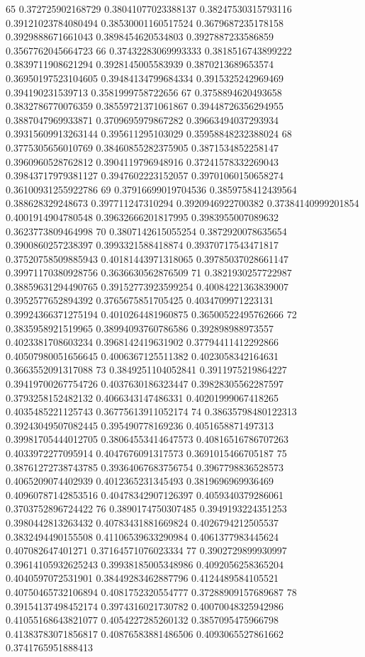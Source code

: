 65 0.372725902168729 0.38041077023388137 0.38247530315793116 0.39121023784080494 0.38530001160517524 0.3679687235178158 0.3929888671661043 0.3898454620534803 0.3927887233586859 0.3567762045664723
66 0.37432283069993333 0.3818516743899222 0.3839711908621294 0.3928145005583939 0.3870213689653574 0.36950197523104605 0.39484134799684334 0.3915325242969469 0.394190231539713 0.3581999758722656
67 0.3758894620493658 0.3832786770076359 0.38559721371061867 0.39448726356294955 0.3887047969933871 0.3709695979867282 0.39663494037293934 0.39315609913263144 0.395611295103029 0.35958848232388024
68 0.3775305656010769 0.38460855282375905 0.3871534852258147 0.3960960528762812 0.3904119796948916 0.37241578332269043 0.39843717979381127 0.3947602223152057 0.39701060150658274 0.36100931255922786
69 0.37916699019704536 0.3859758412439564 0.388628329248673 0.397711247310294 0.3920946922700382 0.37384140999201854 0.4001914904780548 0.39632666201817995 0.3983955007089632 0.3623773809464998
70 0.3807142615055254 0.3872920078635654 0.3900860257238397 0.3993321588418874 0.39370717543471817 0.37520758509885943 0.40181443971318065 0.39785037028661147 0.39971170380928756 0.3636630562876509
71 0.3821930257722987 0.38859631294490765 0.39152773923599254 0.40084221363839007 0.3952577652894392 0.3765675851705425 0.4034709971223131 0.39924366371275194 0.4010264481960875 0.36500522495762666
72 0.3835958921519965 0.38994093760786586 0.392898988973557 0.4023381708603234 0.3968142419631902 0.37794411412292866 0.40507980051656645 0.4006367125511382 0.4023058342164631 0.3663552091317088
73 0.3849251104052841 0.3911975219864227 0.39419700267754726 0.4037630186323447 0.39828305562287597 0.3793258152482132 0.4066343147486331 0.40201999067418265 0.4035485221125743 0.36775613911052174
74 0.38635798480122313 0.39243049507082445 0.395490778169236 0.4051658871497313 0.39981705444012705 0.38064553414647573 0.40816516786707263 0.4033972277095914 0.4047676091317573 0.3691015466705187
75 0.38761272738743785 0.39364067683756754 0.3967798836528573 0.4065209074402939 0.4012365231345493 0.3819696969936469 0.40960787142853516 0.40478342907126397 0.4059340379286061 0.3703752896724422
76 0.3890174750307485 0.3949193224351253 0.3980442813263432 0.40783431881669824 0.4026794212505537 0.3832494490155508 0.41106539633290984 0.4061377983445624 0.407082647401271 0.37164571076023334
77 0.3902729899930997 0.39614105932625243 0.39938185005348986 0.4092056258365204 0.4040597072531901 0.38449283462887796 0.4124489584105521 0.40750465732106894 0.4081752320554777 0.37288909157689687
78 0.39154137498452174 0.3974316021730782 0.40070048325942986 0.41055168643821077 0.4054227285260132 0.3857095475966798 0.41383783071856817 0.40876583881486506 0.4093065527861662 0.3741765951888413
